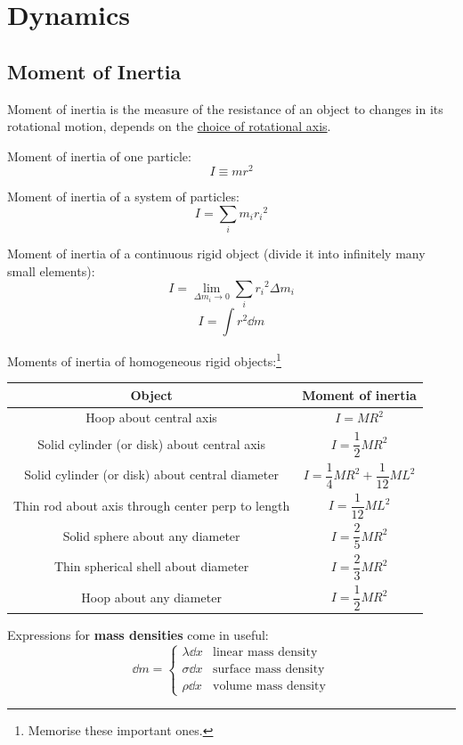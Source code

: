 \section{Dynamics}
\subsection{Moment of Inertia}
Moment of inertia is the measure of the resistance of an object to changes in its rotational motion, depends on the \underline{choice of rotational axis}.

Moment of inertia of one particle:
\begin{equation}
I \equiv mr^2
\end{equation}

Moment of inertia of a system of particles:
\begin{equation}
I = \sum_i m_i {r_i}^2
\end{equation}

Moment of inertia of a continuous rigid object (divide it into infinitely many small elements):
\[ I = \lim_{\Delta m_i \to 0} \sum_i {r_i}^2 \Delta m_i \]
\begin{equation}
I = \int r^2 \dd{m}
\end{equation}

Moments of inertia of homogeneous rigid objects:\footnote{Memorise these important ones.}
\begin{table}[H]
\centering
\renewcommand{\arraystretch}{2.0}
\begin{tabular}{|c|c|}
\hline
\textbf{Object} & \textbf{Moment of inertia} \\
\hline
Hoop about central axis & $I=MR^2$ \\
Solid cylinder (or disk) about central axis & $I=\dfrac{1}{2}MR^2$ \\
Solid cylinder (or disk) about central diameter & $I=\dfrac{1}{4}MR^2+\dfrac{1}{12}ML^2$ \\
Thin rod about axis through center perp to length & $I=\dfrac{1}{12}ML^2$ \\
Solid sphere about any diameter & $I=\dfrac{2}{5}MR^2$ \\
Thin spherical shell about diameter & $I=\dfrac{2}{3}MR^2$ \\
Hoop about any diameter & $I=\dfrac{1}{2}MR^2$ \\
\hline
\end{tabular}
\end{table}

Expressions for \textbf{mass densities} come in useful:
\[ \dd{m} = \begin{cases}
    \lambda \dd{x} & \text{linear mass density} \\
    \sigma \dd{x} & \text{surface mass density} \\
    \rho \dd{x} & \text{volume mass density}
\end{cases} \]
\pagebreak

